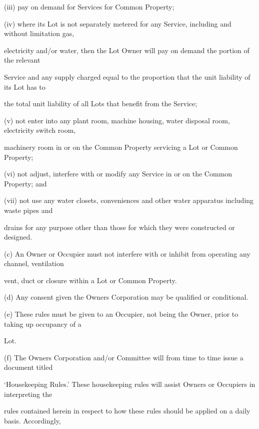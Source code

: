 \documentclass{article}
\begin{document}
{\fontsize{9.962}{1}(iii) pay on demand for Services for Common Property; }

{\fontsize{9.962}{1}(iv) where its Lot is not separately metered for any Service, including and without limitation gas, }

\newpage

{\fontsize{10.02}{1}electricity and/or water, then the Lot Owner will pay on demand the portion of the relevant }

{\fontsize{10.02}{1}Service and any supply charged equal to the proportion that the unit liability of its Lot has to }

{\fontsize{10.02}{1}the total unit liability of all Lots that benefit from the Service; }

{\fontsize{9.962}{1}(v) not enter into any plant room, machine housing, water disposal room, electricity switch room, }

{\fontsize{10.02}{1}machinery room in or on the Common Property servicing a Lot or Common Property; }

{\fontsize{9.962}{1}(vi) not adjust, interfere with or modify any Service in or on the Common Property; and }

{\fontsize{9.962}{1}(vii) not use any water closets, conveniences and other water apparatus including waste pipes and }

{\fontsize{10.02}{1}drains for any purpose other than those for which they were constructed or designed. }

{\fontsize{9.962}{1}(c) An Owner or Occupier must not interfere with or inhibit from operating any channel, ventilation }

{\fontsize{10.02}{1}vent, duct or closure within a Lot or Common Property. }

{\fontsize{9.962}{1}(d) Any consent given the Owners Corporation may be qualified or conditional. }

{\fontsize{9.962}{1}(e) These rules must be given to an Occupier, not being the Owner, prior to taking up occupancy of a }

{\fontsize{10.02}{1}Lot. }

{\fontsize{9.962}{1}(f) The Owners Corporation and/or Committee will from time to time issue a document titled }

{\fontsize{10.02}{1}‘Housekeeping Rules.’ These housekeeping rules will assist Owners or Occupiers in interpreting the }

{\fontsize{10.02}{1}rules contained herein in respect to how these rules should be applied on a daily basis. Accordingly, }
\end{document}
